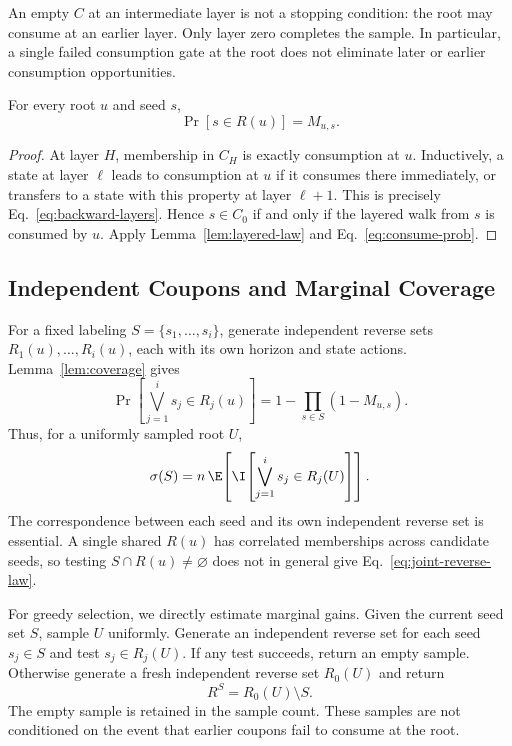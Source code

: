 An empty $C$ at an intermediate layer is not a stopping condition:
the root may consume at an earlier layer. Only layer zero completes
the sample. In particular, a single failed consumption gate at the
root does not eliminate later or earlier consumption opportunities.

\begin{lemma}
\label{lem:coverage}
For every root $u$ and seed $s$,
\begin{equation}
\label{eq:single-reverse-law}
  \Pr[s\in R(u)]=M_{u,s}.
\end{equation}
\end{lemma}

\begin{proof}
At layer $H$, membership in $C_H$ is exactly consumption at $u$.
Inductively, a state at layer $\ell$ leads to consumption at $u$
if it consumes there immediately, or transfers to a state with this
property at layer $\ell+1$. This is precisely
Eq.~\eqref{eq:backward-layers}. Hence $s\in C_0$ if and only if
the layered walk from $s$ is consumed by $u$. Apply
Lemma~\ref{lem:layered-law} and Eq.~\eqref{eq:consume-prob}.
\end{proof}

\subsection{Independent Coupons and Marginal Coverage}
\label{sec:marginal-coverage}

For a fixed labeling $S=\{s_1,\ldots,s_i\}$, generate independent
reverse sets $R_1(u),\ldots,R_i(u)$, each with its own horizon and
state actions. Lemma~\ref{lem:coverage} gives
\begin{equation}
\label{eq:joint-reverse-law}
  \Pr\!\left[\bigvee_{j=1}^{i}s_j\in R_j(u)\right]
       =1-\prod_{s\in S}(1-M_{u,s}).
\end{equation}
Thus, for a uniformly sampled root $U$,
\[
  \sigma(S)=n\,\E\!\left[
    \I\!\left[\bigvee_{j=1}^{i}s_j\in R_j(U)\right]\right].
\]
The correspondence between each seed and its own independent reverse
set is essential. A single shared $R(u)$ has correlated memberships
across candidate seeds, so testing $S\cap R(u)\ne\varnothing$ does
not in general give Eq.~\eqref{eq:joint-reverse-law}.

For greedy selection, we directly estimate marginal gains. Given the
current seed set $S$, sample $U$ uniformly. Generate an independent
reverse set for each seed $s_j\in S$ and test $s_j\in R_j(U)$.
If any test succeeds, return an empty sample. Otherwise generate a
fresh independent reverse set $R_0(U)$ and return
\begin{equation}
\label{eq:marginal-reverse-set}
  R^S=R_0(U)\setminus S.
\end{equation}
The empty sample is retained in the sample count. These samples are
not conditioned on the event that earlier coupons fail to consume
at the root.

